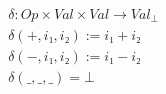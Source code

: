 {\scriptsize
\begin{align*}
& \hspace{0em}   \delta : Op × Val × Val → Val_⊥      \\
& \hspace{0em}   \delta(\plus, i₁, i₂) := i₁ + i₂     \\
& \hspace{0em}   \delta(\minus, i₁, i₂) := i₁ - i₂    \\
& \hspace{0em}   \delta(\_, \_, \_) = ⊥
\end{align*}
}
